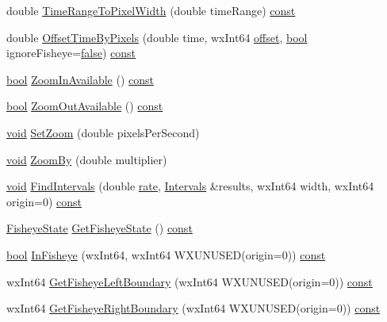 \begin{DoxyCompactItemize}
double \hyperlink{class_zoom_info_a33e482f0ea58e800332e12d8491252eb}{Time\+Range\+To\+Pixel\+Width} (double time\+Range) \hyperlink{getopt1_8c_a2c212835823e3c54a8ab6d95c652660e}{const} 
\item 
double \hyperlink{class_zoom_info_a1a372776b3fc3c9a1fe7f7377a996745}{Offset\+Time\+By\+Pixels} (double time, wx\+Int64 \hyperlink{layer12_8c_a33d71f23ba2052d17f0b754dc35265b0}{offset}, \hyperlink{mac_2config_2i386_2lib-src_2libsoxr_2soxr-config_8h_abb452686968e48b67397da5f97445f5b}{bool} ignore\+Fisheye=\hyperlink{mac_2config_2i386_2lib-src_2libsoxr_2soxr-config_8h_a65e9886d74aaee76545e83dd09011727}{false}) \hyperlink{getopt1_8c_a2c212835823e3c54a8ab6d95c652660e}{const} 
\item 
\hyperlink{mac_2config_2i386_2lib-src_2libsoxr_2soxr-config_8h_abb452686968e48b67397da5f97445f5b}{bool} \hyperlink{class_zoom_info_ac247c13068e8249869e17364e06885ea}{Zoom\+In\+Available} () \hyperlink{getopt1_8c_a2c212835823e3c54a8ab6d95c652660e}{const} 
\item 
\hyperlink{mac_2config_2i386_2lib-src_2libsoxr_2soxr-config_8h_abb452686968e48b67397da5f97445f5b}{bool} \hyperlink{class_zoom_info_afd626bb225c7689844b6ded027048580}{Zoom\+Out\+Available} () \hyperlink{getopt1_8c_a2c212835823e3c54a8ab6d95c652660e}{const} 
\item 
\hyperlink{sound_8c_ae35f5844602719cf66324f4de2a658b3}{void} \hyperlink{class_zoom_info_ac2078ac51a3c9904d3ba445cd3ed35fa}{Set\+Zoom} (double pixels\+Per\+Second)
\item 
\hyperlink{sound_8c_ae35f5844602719cf66324f4de2a658b3}{void} \hyperlink{class_zoom_info_ae3d12affa4d45347738614b5f51f5937}{Zoom\+By} (double multiplier)
\item 
\hyperlink{sound_8c_ae35f5844602719cf66324f4de2a658b3}{void} \hyperlink{class_zoom_info_aff75f3d72f5fef0e3472ac4c415e63f3}{Find\+Intervals} (double \hyperlink{seqread_8c_ad89d3fac2deab7a9cf6cfc8d15341b85}{rate}, \hyperlink{class_zoom_info_a68d0856b5e64abd74f91ebeedac395d3}{Intervals} \&results, wx\+Int64 width, wx\+Int64 origin=0) \hyperlink{getopt1_8c_a2c212835823e3c54a8ab6d95c652660e}{const} 
\item 
\hyperlink{class_zoom_info_a21e3cd944a2c0241db3c32b2416ba7b6}{Fisheye\+State} \hyperlink{class_zoom_info_a342ed72b12a2ff5663d22e93d9a3c44c}{Get\+Fisheye\+State} () \hyperlink{getopt1_8c_a2c212835823e3c54a8ab6d95c652660e}{const} 
\item 
\hyperlink{mac_2config_2i386_2lib-src_2libsoxr_2soxr-config_8h_abb452686968e48b67397da5f97445f5b}{bool} \hyperlink{class_zoom_info_a58a0384edf7d035b5be58f6b0b25bdb5}{In\+Fisheye} (wx\+Int64, wx\+Int64 W\+X\+U\+N\+U\+S\+ED(origin=0)) \hyperlink{getopt1_8c_a2c212835823e3c54a8ab6d95c652660e}{const} 
\item 
wx\+Int64 \hyperlink{class_zoom_info_aa762137abb7f349ee3ac25dfce0c3635}{Get\+Fisheye\+Left\+Boundary} (wx\+Int64 W\+X\+U\+N\+U\+S\+ED(origin=0)) \hyperlink{getopt1_8c_a2c212835823e3c54a8ab6d95c652660e}{const} 
\item 
wx\+Int64 \hyperlink{class_zoom_info_ab565b4ba0354aa8b409f2e3096e55143}{Get\+Fisheye\+Right\+Boundary} (wx\+Int64 W\+X\+U\+N\+U\+S\+ED(origin=0)) \hyperlink{getopt1_8c_a2c212835823e3c54a8ab6d95c652660e}{const} 
\end{DoxyCompactItemize}
